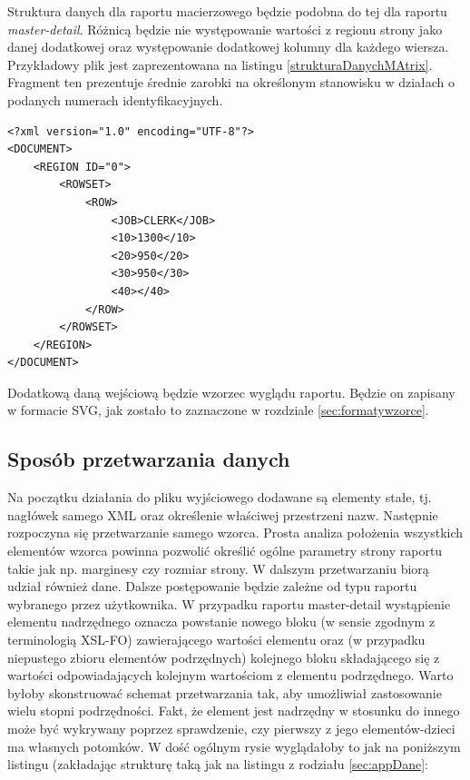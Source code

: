 \documentclass[11pt,a4paper]{article}
\begin{document}
Struktura danych dla raportu macierzowego będzie podobna do tej dla raportu \emph{master-detail}. Różnicą będzie nie występowanie wartości z regionu strony jako danej dodatkowej oraz występowanie dodatkowej kolumny dla każdego wiersza. Przykładowy plik jest zaprezentowana na listingu \ref{strukturaDanychMAtrix}. Fragment ten prezentuje średnie zarobki na określonym stanowisku w działach o podanych numerach identyfikacyjnych.

\lstset{language=XML}
\begin{lstlisting}[frame=single,caption=Zakładana struktura pliku z danymi wejściowymi dla raportu macierzowego,label=strukturaDanychMAtrix]
<?xml version="1.0" encoding="UTF-8"?>
<DOCUMENT>
    <REGION ID="0">
        <ROWSET>
            <ROW>
                <JOB>CLERK</JOB>
                <10>1300</10>
                <20>950</20>
                <30>950</30>
                <40></40>
            </ROW>
        </ROWSET>
    </REGION>
</DOCUMENT>
\end{lstlisting}


Dodatkową daną wejściową będzie wzorzec wyglądu raportu. Będzie on zapisany w formacie SVG, jak zostało to zaznaczone w rozdziale \ref{sec:formatywzorce}.

\subsection{Sposób przetwarzania danych}\label{sec:appPrzetwarzanie}
Na początku działania do pliku wyjściowego dodawane są elementy stałe, tj. nagłówek samego XML oraz określenie właściwej przestrzeni nazw. Następnie rozpoczyna się przetwarzanie samego wzorca. Prosta analiza położenia wszystkich elementów wzorca powinna pozwolić określić ogólne parametry strony raportu takie jak np. marginesy czy rozmiar strony. W dalszym przetwarzaniu biorą udział również dane. Dalsze postępowanie będzie zależne od typu raportu wybranego przez użytkownika. W przypadku raportu master-detail wystąpienie elementu nadrzędnego oznacza powstanie nowego bloku (w sensie zgodnym z terminologią XSL-FO) zawierającego wartości elementu oraz (w przypadku niepustego zbioru elementów podrzędnych) kolejnego bloku składającego się z wartości odpowiadających kolejnym wartościom z elementu podrzędnego. Warto byłoby skonstruować schemat przetwarzania tak, aby umożliwiał zastosowanie wielu stopni podrzędności. Fakt, że element jest nadrzędny w stosunku do innego może być wykrywany poprzez sprawdzenie, czy pierwszy z jego elementów-dzieci ma własnych potomków. W dość ogólnym rysie wyglądałoby to jak na poniższym listingu (zakładając strukturę taką jak na listingu z rodziału \ref{sec:appDane}:\\
\end{document}
